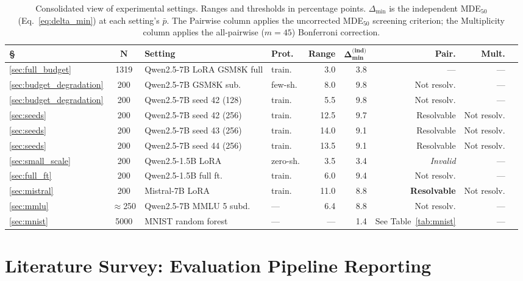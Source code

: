 \documentclass[pdflatex,sn-mathphys-ay,iicol]{sn-jnl}
\theoremstyle{thmstylethree}
\begin{document}
\begin{table}[t]
\begin{table}[t]
\centering
\caption{Consolidated view of experimental settings. Ranges and thresholds in percentage points. $\Delta_{\min}$ is the independent MDE$_{50}$ (Eq.~\ref{eq:delta_min}) at each setting's $\bar{p}$. The Pairwise column applies the uncorrected MDE$_{50}$ screening criterion; the Multiplicity column applies the all-pairwise ($m=45$) Bonferroni correction.}
\label{tab:all_settings}
\centering
\small
\setlength{\tabcolsep}{2.5pt}
\begin{tabular}{lcp{24mm}lrrrrl}\toprule
\textbf{\S} & $\bm{N}$ & \textbf{Setting} & \textbf{Prot.} & \textbf{Range} & $\bm{\Delta_{\min}^{\text{(ind)}}}$ & \textbf{Pair.} & \textbf{Mult.} \\\midrule
\ref{sec:full_budget} & 1319 & Qwen2.5-7B LoRA GSM8K full & train. & 3.0 & 3.8 & --- & --- \\
\ref{sec:budget_degradation} & 200 & Qwen2.5-7B GSM8K sub. & few-sh. & 8.0 & 9.8 & Not resolv. & --- \\
\ref{sec:budget_degradation} & 200 & Qwen2.5-7B seed 42 (128) & train. & 5.5 & 9.8 & Not resolv. & --- \\
\ref{sec:seeds} & 200 & Qwen2.5-7B seed 42 (256) & train. & 12.5 & 9.7 & Resolvable & Not resolv. \\
\ref{sec:seeds} & 200 & Qwen2.5-7B seed 43 (256) & train. & 14.0 & 9.1 & Resolvable & Not resolv. \\
\ref{sec:seeds} & 200 & Qwen2.5-7B seed 44 (256) & train. & 13.5 & 9.1 & Resolvable & Not resolv. \\
\ref{sec:small_scale} & 200 & Qwen2.5-1.5B LoRA & zero-sh. & 3.5 & 3.4 & \emph{Invalid} & --- \\
\ref{sec:full_ft} & 200 & Qwen2.5-1.5B full ft. & train. & 6.0 & 9.4 & Not resolv. & --- \\
\ref{sec:mistral} & 200 & Mistral-7B LoRA & train. & 11.0 & 8.8 & \textbf{Resolvable} & Not resolv. \\
\ref{sec:mmlu} & $\approx$250 & Qwen2.5-7B MMLU 5 subd. & --- & 6.4 & 8.8 & Not resolv. & --- \\
\ref{sec:mnist} & 5000 & MNIST random forest & --- & --- & 1.4 & See Table~\ref{tab:mnist} & --- \\
\bottomrule
\end{tabular}
\end{table}

\section{Literature Survey: Evaluation Pipeline Reporting}\label{sec:survey}


\end{table}
\end{document}
